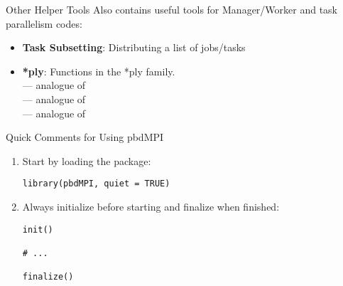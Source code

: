 \begin{frame}
  \begin{block}{Other Helper Tools}\pause
   Also contains useful tools for Manager/Worker and task parallelism codes:
    \begin{itemize}
      \item \textbf{Task Subsetting}: Distributing a list of jobs/tasks\\ 
      \item \textbf{*ply}:  Functions in the *ply family.\\
       --- analogue of \\
       --- analogue of \\
       --- analogue of \\
    \end{itemize}
  \end{block}
\end{frame}






\begin{frame}[fragile]
  \begin{block}{Quick Comments for Using pbdMPI}\pause
    \begin{enumerate}
      \item Start by loading the package:
\vspace{-.4cm}
\begin{lstlisting}
library(pbdMPI, quiet = TRUE)
\end{lstlisting}
      \item Always initialize before starting and finalize when finished:
\vspace{-.4cm}
\begin{lstlisting}
init()

# ...

finalize()
\end{lstlisting}
\end{enumerate}
\end{block}
\end{frame}